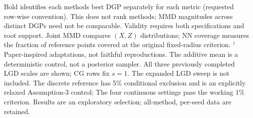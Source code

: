 \documentclass[11pt]{article}
\begin{document}
\begin{table}[t]
\begin{minipage}{\textwidth}
Bold identifies each method\textquotesingle s best DGP separately for each metric (requested row-wise convention). This does not rank methods; MMD magnitudes across distinct DGPs need not be comparable.
Validity requires both specifications and root support. Joint MMD compares $(X,Z)$ distributions; NN coverage measures the fraction of reference points covered at the original fixed-radius criterion.
$^{\dagger}$Paper-inspired adaptations, not faithful reproductions. The additive mean is a deterministic control, not a posterior sampler. All three previously completed LGD scales are shown; CG rows fix $s=1$. The expanded LGD sweep is not included.
The discrete reference has 5\% conditional exclusion and is an explicitly relaxed Assumption-3 control; The four continuous settings pass the working 1\% criterion. Results are an exploratory selection; all-method, per-seed data are retained.
\end{minipage}
\end{table}
\end{document}
